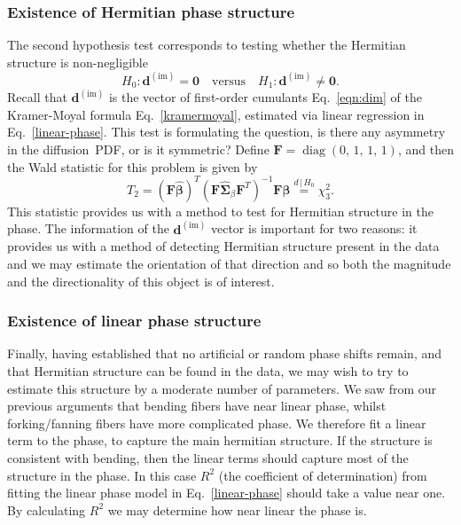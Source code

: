 \documentclass[authoryear,preprint,12pt]{elsarticle}
\DeclareMathOperator*{\diag}{diag}
\newcommand{\im}{\text{im}}
\newcommand{\bF}{\mathbf{F}}
\newcommand{\bsS}{\bs{\Sigma}}
\newcommand{\bld}[1]{\mathbf{#1}}
\newcommand{\bs}[1]{\boldsymbol{#1}}
\newcommand{\wh}[1]{\widehat{#1}}
\begin{document}
\subsubsection{Existence of Hermitian phase structure}

The second hypothesis test corresponds to testing whether the
Hermitian structure is non-negligible
\begin{equation}
  H_0: \bld{d}^{(\im)} = \bld{0} \quad \text{versus} \quad 
  H_1: \bld{d}^{(\im)} \neq \bld{0}. 
\end{equation}
Recall that $\bld{d}^{(\im)}$ is the vector of first-order cumulants
Eq.~\eqref{eqn:dim} of the Kramer-Moyal formula
Eq.~\eqref{kramermoyal}, estimated via linear regression in
Eq.~\eqref{linear-phase}.  This test is formulating the question, is
there any asymmetry in the diffusion~PDF, or is it symmetric?  Define
$\bF=\diag\left(0,\,1,\,1,\,1\right)$, and then the Wald statistic for
this problem is given by
\begin{equation}
  T_2 = \left(\bF\hat{\bs{\beta}}\right)^T
  \left(\bF\wh{\bsS}_{\beta}\bF^T\right)^{-1}
  \bF\hat{\bs{\beta}} \overset{d\,|\,H_0}{=} \chi^2_3.
\end{equation}
This statistic provides us with a method to test for Hermitian
structure in the phase.  The information of the $\bld{d}^{(\im)}$
vector is important for two reasons: it provides us with a method of
detecting Hermitian structure present in the data and we may estimate
the orientation of that direction and so both the magnitude and the
directionality of this object is of interest.

\subsubsection{Existence of linear phase structure}

Finally, having established that no artificial or random phase shifts
remain, and that Hermitian structure can be found in the data, we may
wish to try to estimate this structure by a moderate number of
parameters.  We saw from our previous arguments that bending fibers
have near linear phase, whilst forking/fanning fibers have more
complicated phase.  We therefore fit a linear term to the phase, to
capture the main hermitian structure.  If the structure is consistent
with bending, then the linear terms should capture most of the
structure in the phase.  In this case $R^2$ (the coefficient of
determination) from fitting the linear phase model in
Eq.~\eqref{linear-phase} should take a value near one.  By calculating
$R^2$ we may determine how near linear the phase is.
\end{document}

